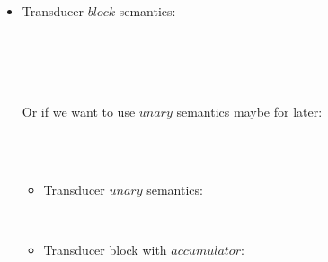 \begin{itemize}
\item Transducer $block$ semantics: \\ 


 \\

 \\

\\

\\


Or if we want to use $unary$ semantics maybe for later: \\
\begin{mdframed}
\\[2ex]

\\[2ex]

\begin{itemize}
\item Transducer $unary$ semantics:\\ 


\PT{ \Axiom{\usum(\oF) \dda \vunit}}
\PT{\Axiom{\usum(\oT) \dda \emptyv }} \\[1ex]


\item Transducer block with $accumulator$: \\

\\[2ex]


\end{itemize}
\end{mdframed}
\end{itemize}
